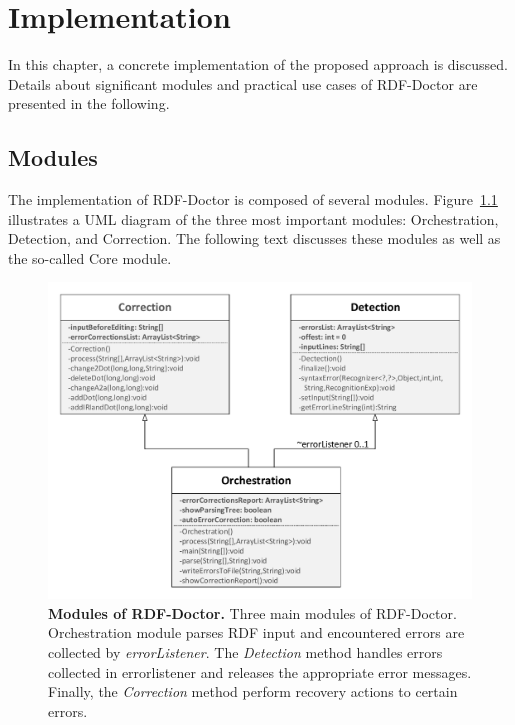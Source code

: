 \chapter{Implementation}
\label{ch:implementation}


In this chapter, a concrete implementation of the proposed approach is discussed. 
Details about significant modules and practical use cases of RDF-Doctor  are presented in the following.  
 
\section {Modules} 

The implementation of RDF-Doctor is composed of several modules.
{Figure~\ref{Fig:UML}} illustrates a UML diagram of the three most important modules: Orchestration, Detection, and Correction. 
The following text discusses these modules as well as the so-called Core module.
	\begin{figure}[ht]
	\begin{center}
		\includegraphics[scale=0.65,angle=0]{images/methods.pdf}
		\setlength{\abovecaptionskip}{0pt} 
				\setlength\belowcaptionskip{-5mm}
		\caption{\textbf{Modules of RDF-Doctor.} 
		Three main modules of RDF-Doctor. 
		Orchestration module parses RDF input and encountered errors are collected by \emph{errorListener}.
		The \emph{Detection} method handles errors collected in errorlistener and releases the appropriate error messages.
		Finally, the \emph{Correction} method perform recovery actions to certain errors.}
		\label{Fig:UML}
	\end{center}
\end{figure}


